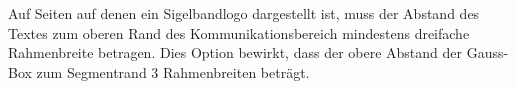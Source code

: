 \begin{Declaration}
\end{Declaration}

Auf Seiten auf denen ein Sigelbandlogo dargestellt ist, muss der Abstand
des Textes zum oberen Rand des Kommunikationsbereich mindestens
dreifache Rahmenbreite betragen. Dies Option  bewirkt,
dass der obere Abstand der Gauss-Box zum Segmentrand 3 Rahmenbreiten beträgt.

